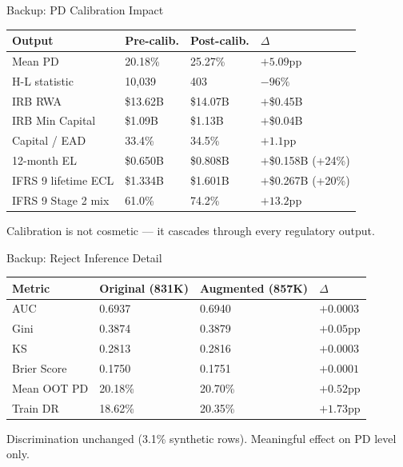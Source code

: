 \documentclass[aspectratio=169,11pt]{beamer}
\begin{document}
\begin{frame}{Backup: PD Calibration Impact}
  \begin{center}\small
    \begin{tabular}{llll}
      \toprule
      \textbf{Output} & \textbf{Pre-calib.} & \textbf{Post-calib.} & \textbf{$\Delta$} \\
      \midrule
      Mean PD               & 20.18\% & 25.27\% & $+5.09$pp \\
      H-L statistic         & 10,039  & 403     & $-96\%$ \\
      IRB RWA               & \$13.62B & \$14.07B & $+$\$0.45B \\
      IRB Min Capital       & \$1.09B  & \$1.13B  & $+$\$0.04B \\
      Capital / EAD         & 33.4\%   & 34.5\%   & $+1.1$pp \\
      12-month EL           & \$0.650B & \$0.808B & $+$\$0.158B (+24\%) \\
      IFRS 9 lifetime ECL   & \$1.334B & \$1.601B & $+$\$0.267B (+20\%) \\
      IFRS 9 Stage 2 mix    & 61.0\%   & 74.2\%   & $+13.2$pp \\
      \bottomrule
    \end{tabular}
  \end{center}
  \vspace{4pt}
  \small Calibration is not cosmetic --- it cascades through every regulatory output.
\end{frame}

\begin{frame}{Backup: Reject Inference Detail}
  \begin{center}\small
    \begin{tabular}{llll}
      \toprule
      \textbf{Metric} & \textbf{Original (831K)} & \textbf{Augmented (857K)} & \textbf{$\Delta$} \\
      \midrule
      AUC         & 0.6937 & 0.6940 & $+0.0003$ \\
      Gini        & 0.3874 & 0.3879 & $+0.05$pp \\
      KS          & 0.2813 & 0.2816 & $+0.0003$ \\
      Brier Score & 0.1750 & 0.1751 & $+0.0001$ \\
      Mean OOT PD & 20.18\% & 20.70\% & $+0.52$pp \\
      Train DR    & 18.62\% & 20.35\% & $+1.73$pp \\
      \bottomrule
    \end{tabular}
  \end{center}
  \vspace{4pt}
  \small Discrimination unchanged (3.1\% synthetic rows). Meaningful effect on PD level only.
\end{frame}
\end{document}
